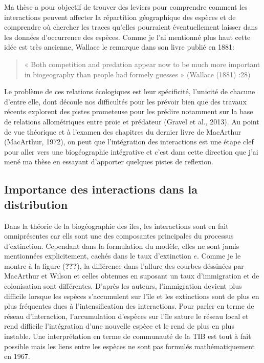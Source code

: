 Ma thèse a pour objectif de trouver des leviers pour comprendre comment
les interactions peuvent affecter la répartition géographique des
espèces et de comprendre où chercher les traces qu'elles pourraient
éventuellement laisser dans les données d'occurrence des espèces. Comme
je l'ai mentionné plus haut cette idée est très ancienne, Wallace le
remarque dans son livre publié en 1881:

\begin{quote}
« Both competition and predation appear now to be much more important in
biogeography than people had formely guesses » (Wallace (1881) :28)
\end{quote}

Le problème de ces relations écologiques est leur spécificité, l'unicité
de chacune d'entre elle, dont découle nos difficultés pour les prévoir
bien que des travaux récents explorent des pistes prometeuse pour les
prédire notamment sur la base de relations allométriques entre proie et
prédateur (Gravel et al., 2013). Au point de vue théorique et à l'examen
des chapitres du dernier livre de MacArthur (MacArthur, 1972), on peut
que l'intégration des interactions est une étape clef pour aller vers
une biogéographie intégrative et c'est dans cette direction que j'ai
mené ma thèse en essayant d'apporter quelques pistes de reflexion.

\subsection*{Importance des interactions dans la
distribution}\label{importance-des-interactions-dans-la-distribution}

Dans la théorie de la biogéographie des îles, les interactions sont en
fait omniprésentes car ells sont une des composantes principales du
processus d'extinction. Cependant dans la formulation du modèle, elles
ne sont jamis mentionnées explicitement, cachés dans le taux
d'extinction \(e\). Comme je le montre à la figure ({\textbf{???}}), la
différence dans l'allure des courbes déssinées par MacArthur et Wilson
et celles obtenues en suposant un taux d'immigration et de colonisation
sont différentes. D'après les auteurs, l'immigration devient plus
difficile lorsque les espèces s'accumulent sur l'île et les extinctions
sont de plus en plus fréquentes dues à l'intensification des
interactions. Pour parler en terme de réseau d'interaction,
l'accumulation d'espèces sur l'île sature le réseau local et rend
difficile l'intégration d'une nouvelle espèce et le rend de plus en plus
instable. Une interprétation en terme de communauté de la TIB est tout à
fait possible mais les liens entre les espèces ne sont pas formulés
mathématiquement en 1967.

